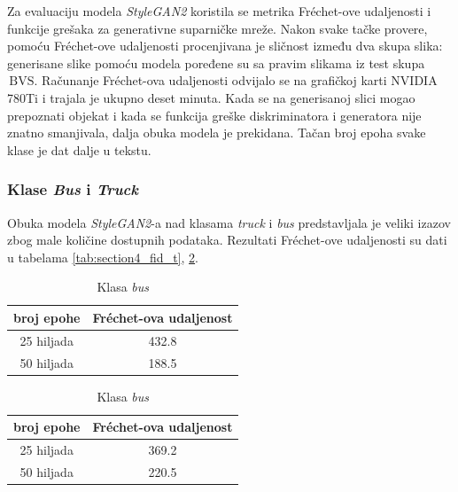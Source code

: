 \documentclass[12pt,oneside]{memoir}
\newcommand{\bvs}{\ensuremath{\,\textrm{BVS}}}
\begin{document}
Za evaluaciju modela \textit{StyleGAN2} koristila se metrika Fréchet-ove udaljenosti i funkcije grešaka za generativne suparničke mreže. Nakon svake tačke provere, pomoću Fréchet-ove udaljenosti procenjivana je sličnost između dva skupa slika: generisane slike pomoću modela poređene su sa pravim slikama iz test skupa \bvs. Računanje Fréchet-ova udaljenosti odvijalo se na grafičkoj karti NVIDIA 780Ti i trajala je ukupno deset minuta. Kada se na generisanoj slici mogao prepoznati objekat i kada se funkcija greške diskriminatora i generatora nije znatno smanjivala, dalja obuka modela je prekidana. Tačan broj epoha svake klase je dat dalje u tekstu.


\subsubsection{Klase \textit{Bus} i \textit{Truck}}

Obuka modela \textit{StyleGAN2}-a nad klasama \textit{truck} i \textit{bus} predstavljala je veliki izazov zbog male količine dostupnih podataka. 
Rezultati Fréchet-ove udaljenosti su dati u tabelama \ref{tab:section4_fid_t}, \ref{tab:section4_fid_b}.

\begin{table}[!htb]
    \begin{minipage}{.5\linewidth}
      \caption{Klasa \textit{truck}}\label{tab:section4_fid_t}
      \centering
        \begin{tabular}{c|c}
        broj epohe &  Fréchet-ova udaljenost \\
        \hline
        25 hiljada & 432.8 \\
        \hline
        50 hiljada & 188.5 \\
        \end{tabular}
    \end{minipage}
    \begin{minipage}{.5\linewidth}
      \centering
        \caption{Klasa \textit{bus}}\label{tab:section4_fid_b}
        \begin{tabular}{c|c}
        broj epohe &  Fréchet-ova udaljenost \\
        \hline
        25 hiljada & 369.2 \\
        \hline
        50 hiljada & 220.5 \\
        \end{tabular}
    \end{minipage} 
\end{table}
\end{document}
